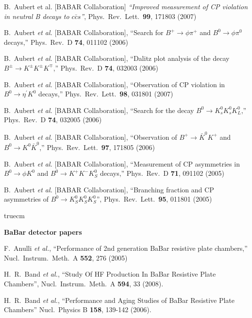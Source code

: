   B.~Aubert et al. [BABAR Collaboration] 
  {\it ``Improved measurement of CP violation in neutral B decays to $c \bar{c} s$''},
  Phys.\ Rev.\ Lett.\  {\bf 99}, 171803 (2007)

  B.~Aubert {\it et al.}  [BABAR Collaboration],
  ``Search for $B^+ \to \phi \pi^+$ and $B^0 \to \phi \pi^0$ decays,''
  Phys.\ Rev.\ D {\bf 74}, 011102 (2006)

  B.~Aubert {\it et al.}  [BABAR Collaboration],
  ``Dalitz plot analysis of the decay $B^{\pm} \to K^{\pm} K^{\pm} K^{\mp}$,''
  Phys.\ Rev.\  D {\bf 74}, 032003 (2006)


  B.~Aubert {\it et al.}  [BABAR Collaboration],
  ``Observation of CP violation in $B^0 \to \eta^\prime K^0$ decays,''
  Phys.\ Rev.\ Lett.\  {\bf 98}, 031801 (2007)

  B.~Aubert {\it et al.}  [BABAR Collaboration],
  ``Search for the decay $B^0 \to K^0_{s} K^0_{s} K^0_{L}$,''
  Phys.\ Rev.\  D {\bf 74}, 032005 (2006)

  B.~Aubert {\it et al.}  [BABAR Collaboration],
  ``Observation of $B^{+} \to \bar{K}^0 K^{+}$ and $B^0 \to K^0 \bar{K}^0$,''
  Phys.\ Rev.\ Lett.\  {\bf 97}, 171805 (2006)

  B.~Aubert {\it et al.}  [BABAR Collaboration],
   ``Measurement of CP asymmetries in $B^0 \to \phi K^0$ and $B^0 \to K^+ K^-K^0_S$  decays,''
  Phys.\ Rev.\ D {\bf 71}, 091102 (2005)

  B.~Aubert {\it et al.}  [BABAR Collaboration],
  ``Branching fraction and CP asymmetries of $B^0 \to K^0_S K^0_S K^0_S$'', 
  Phys.\ Rev.\ Lett.\  {\bf 95}, 011801 (2005)


 truecm

{\bf BaBar detector papers}

  F.~Anulli {\it et al.},
  ``Performance of 2nd generation BaBar resistive plate chambers,''
  Nucl.\ Instrum.\ Meth.\ A {\bf 552}, 276 (2005)

  H.~R.~Band {\it et al.},
  ``Study Of HF Production In BaBar Resistive Plate Chambers'',
  Nucl.\ Instrum.\ Meth.\  A {\bf 594}, 33 (2008).

  H.~R.~Band {\it et al.},
  ``Performance and Aging Studies of BaBar Resistive Plate Chambers''
  Nucl.\ Physics B {\bf 158}, 139-142 (2006).
